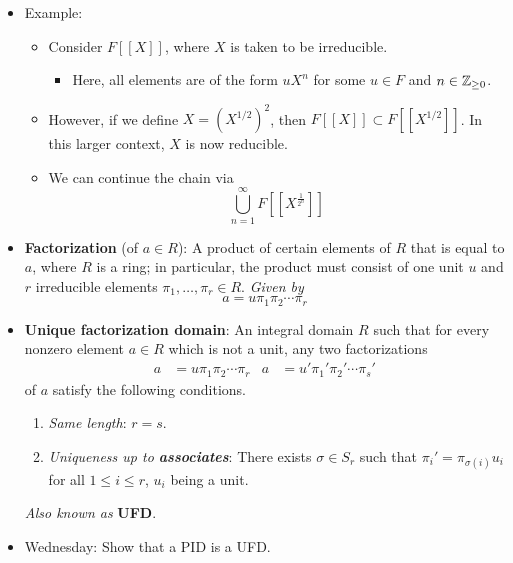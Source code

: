 \documentclass[../notes.tex]{subfiles}
\begin{document}
\begin{itemize}
    \item Example:
    \begin{itemize}
        \item Consider $F[[X]]$, where $X$ is taken to be irreducible.
        \begin{itemize}
            \item Here, all elements are of the form $uX^n$ for some $u\in F$ and $n\in{\mathbb{Z}_{\geq 0}}$.
        \end{itemize}
        \item However, if we define $X=(X^{1/2})^2$, then $F[[X]]\subset F[[X^{1/2}]]$. In this larger context, $X$ is now reducible.
        \item We can continue the chain via
        \begin{equation*}
            \bigcup_{n=1}^\infty F[[X^{\frac{1}{2^n}}]]
        \end{equation*}
    \end{itemize}
    \item \textbf{Factorization} (of $a\in R$): A product of certain elements of $R$ that is equal to $a$, where $R$ is a ring; in particular, the product must consist of one unit $u$ and $r$ irreducible elements $\pi_1,\dots,\pi_r\in R$. \emph{Given by}
    \begin{equation*}
        a = u\pi_1\pi_2\cdots\pi_r
    \end{equation*}
    \item \textbf{Unique factorization domain}: An integral domain $R$ such that for every nonzero element $a\in R$ which is not a unit, any two factorizations
    \begin{align*}
        a &= u\pi_1\pi_2\cdots\pi_r&
        a &= u'\pi_1'\pi_2'\cdots\pi_s'
    \end{align*}
    of $a$ satisfy the following conditions.
    \begin{enumerate}[label={(\roman*)}]
        \item \emph{Same length}: $r=s$.
        \item \emph{Uniqueness up to \textbf{associates}}: There exists $\sigma\in S_r$ such that $\pi_i'=\pi_{\sigma(i)}u_i$ for all $1\leq i\leq r$, $u_i$ being a unit.
    \end{enumerate}
    \emph{Also known as} \textbf{UFD}.
    \item Wednesday: Show that a PID is a UFD.
\end{itemize}
\end{document}

